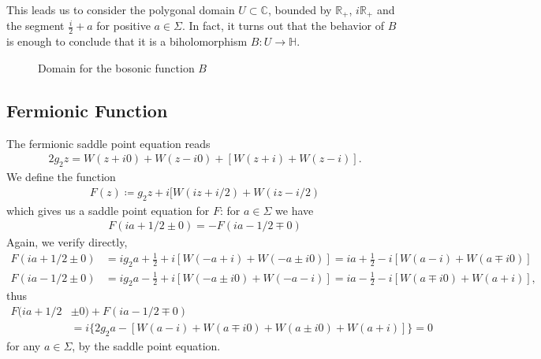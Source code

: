 \documentclass[10pt]{article}
\newcommand{\rr}{\mathbb{R}}
\newcommand{\cc}{\mathbb{C}}
\newcommand{\hh}{\mathbb{H}}
\newcommand{\re}[1]{\text{Re}(#1)}
\newcommand{\im}[1]{\text{Im}(#1)}
\theoremstyle{plain}
\theoremstyle{definition}
\theoremstyle{plain}
\begin{document}
This leads us to consider the polygonal domain $U\subset \cc$, bounded by $\rr_+$, $i\rr_+$ and the segment $\frac{i}{2}+a$ for positive $a\in \Sigma$. In fact, it turns out that the behavior of $B$ is enough to conclude that it is a biholomorphism $B:U\to \hh$.

\begin{figure}\label{bosonicdomain}
\begin{center}
\end{center}
\caption{Domain for the bosonic function $B$}
\end{figure}

\subsection{Fermionic Function}

The fermionic saddle point equation reads
\begin{align*}
	2g_2z = W(z+i0) + W(z-i0) + [W(z+i) + W(z-i)]. 
\end{align*} 
We define the function
\begin{align*}
	F(z) \coloneqq g_2z + i[ W(iz + i/2) + W(iz - i/2) 
\end{align*} 
which gives us a saddle point equation for $F$: for $a\in \Sigma$ we have
\begin{align*}
	F(ia+1/2\pm 0) = -F(ia - 1/2 \mp 0) 
\end{align*} 
Again, we verify directly,
\begin{align*}
	F(ia + 1/2 \pm 0 ) &= ig_2a + \frac{1}{2} + i[W(-a+i)+W(-a\pm i0)] = ia + \frac{1}{2} -i[W(a-i)+W(a\mp i0)]\\
	F(ia - 1/2 \pm 0)  &= ig_2a - \frac{1}{2} + i[W(-a\pm i0)+W(-a-i)]= ia - \frac{1}{2} - i[W(a\mp i0)+W(a+i)],
\end{align*}
thus
\begin{align*}
	F(ia+1/2&\pm 0) + F(ia - 1/2 \mp 0) \\&
	= i\bigg\{	2g_2a - [W(a-i)+W(a\mp i0) + W(a\pm i0) + W(a+i)]  \bigg\} = 0 	
\end{align*}
for any $a\in \Sigma$, by the saddle point equation.
\end{document}
